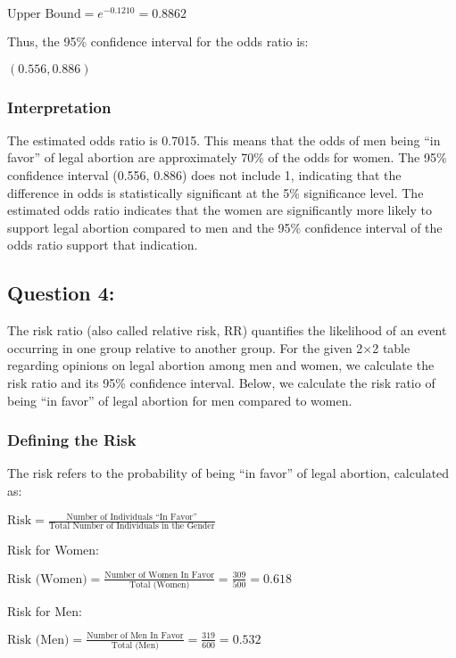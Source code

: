 \documentclass[
]{article}
\begin{document}
\({\text{Upper Bound} = e^{-0.1210} = 0.8862}\)

Thus, the 95\% confidence interval for the odds ratio is:

\({(0.556, 0.886)}\)

\subsubsection{Interpretation}\label{interpretation}

The estimated odds ratio is 0.7015. This means that the odds of men
being ``in favor'' of legal abortion are approximately 70\% of the odds
for women. The 95\% confidence interval (0.556, 0.886) does not include
1, indicating that the difference in odds is statistically significant
at the 5\% significance level. The estimated odds ratio indicates that
the women are significantly more likely to support legal abortion
compared to men and the 95\% confidence interval of the odds ratio
support that indication.

\subsection{Question 4:}\label{question-4}

The risk ratio (also called relative risk, RR) quantifies the likelihood
of an event occurring in one group relative to another group. For the
given 2×2 table regarding opinions on legal abortion among men and
women, we calculate the risk ratio and its 95\% confidence interval.
Below, we calculate the risk ratio of being ``in favor'' of legal
abortion for men compared to women.

\subsubsection{Defining the Risk}\label{defining-the-risk}

The risk refers to the probability of being ``in favor'' of legal
abortion, calculated as:

\({\text{Risk} = \frac{\text{Number of Individuals “In Favor”}}{\text{Total Number of Individuals in the Gender}}}\)

Risk for Women:

\({\text{Risk (Women)} = \frac{\text{Number of Women In Favor}}{\text{Total (Women)}} = \frac{309}{500} = 0.618}\)

Risk for Men:

\({\text{Risk (Men)} = \frac{\text{Number of Men In Favor}}{\text{Total (Men)}} = \frac{319}{600} = 0.532}\)
\end{document}
